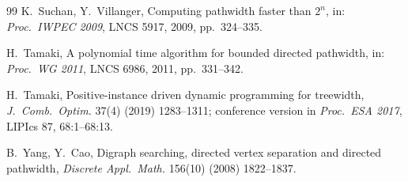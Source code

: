 \documentclass[11pt]{article}
\theoremstyle{definition}
\begin{document}
\begin{thebibliography}{99}
K.~Suchan, Y.~Villanger,
Computing pathwidth faster than $2^n$,
in: \emph{Proc.\ IWPEC 2009}, LNCS 5917, 2009, pp.~324--335.

H.~Tamaki,
A polynomial time algorithm for bounded directed pathwidth,
in: \emph{Proc.\ WG 2011}, LNCS 6986, 2011, pp.~331--342.

H.~Tamaki,
Positive-instance driven dynamic programming for treewidth,
\emph{J.\ Comb.\ Optim.} 37(4) (2019) 1283--1311; conference version in
\emph{Proc.\ ESA 2017}, LIPIcs 87, 68:1--68:13.

B.~Yang, Y.~Cao,
Digraph searching, directed vertex separation and directed pathwidth,
\emph{Discrete Appl.\ Math.} 156(10) (2008) 1822--1837.
\end{thebibliography}
\end{document}
